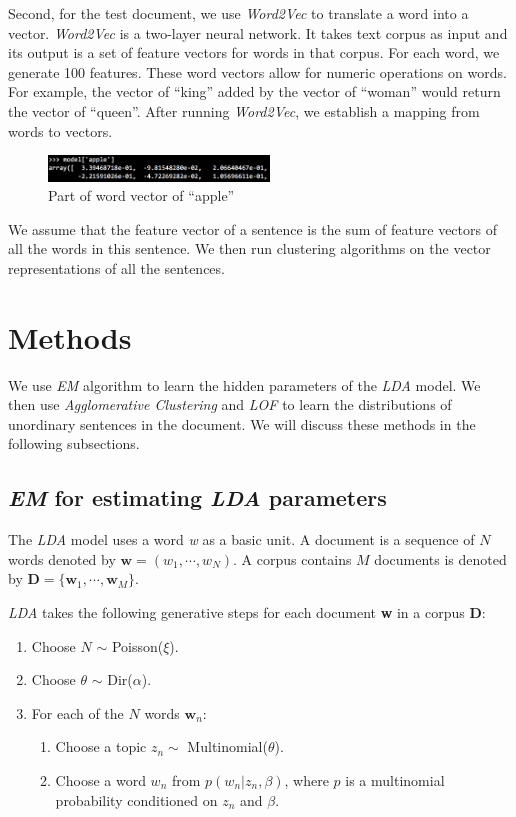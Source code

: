 \documentclass[conference,compsoc]{IEEEtran}
\begin{document}
  Second, for the test document, we use \emph{Word2Vec} to translate a word into a vector. \emph{Word2Vec} is a two-layer neural network. It takes text corpus as input and its output is a set of feature vectors for words in that corpus. For each word, we generate 100 features. These word vectors allow for numeric operations on words. For example, the vector of ``king'' added by the vector of ``woman'' would return the vector of ``queen''. After running \emph{Word2Vec}, we establish a mapping from words to vectors. 
  \begin{figure}[h!]
  \centering
          \includegraphics[height=0.7cm]{word2veceg3.png}
      \caption{Part of word vector of ``apple''}
      \label{fig:verticalcell}
  \end{figure}

  We assume that the feature vector of a sentence is the sum of feature vectors of all the words in this sentence. We then run clustering algorithms on the vector representations of all the sentences. 

\section{Methods}
  We use \emph{EM} algorithm to learn the hidden parameters of the \emph{LDA} model. We then use \emph{Agglomerative Clustering} and \emph{LOF} to learn the distributions of unordinary sentences in the document. We will discuss these methods in the following subsections. 

  \subsection{\emph{EM} for estimating \emph{LDA} parameters}
  The \emph{LDA} model uses a word \emph{w} as a basic unit. A document is a sequence of $N$ words denoted by $\textbf{w} = (w_1, \cdots, w_N )$. A corpus contains $M$ documents is denoted by $\textbf{D} = \{ \textbf{w}_1, \cdots, \textbf{w}_M \}$.  

  \emph{LDA} takes the following generative steps for each document \textbf{w} in a corpus \textbf{D}:

\begin{enumerate}

    \item Choose $N$ $\sim$ Poisson($\xi$).
    \item Choose $\theta$ $\sim$ Dir($\alpha$).
    \item For each of the $N$ words $\textbf{w}_n$:
    \begin{enumerate}[label=\roman*]
      \item Choose a topic $z_n \sim$ Multinomial($\theta$).
      \item Choose a word $w_n$ from $p(w_n | z_n, \beta)$, where $p$ is a multinomial probability conditioned on $z_n$ and $\beta$. 
    \end{enumerate}
\end{enumerate}
  
\end{document}
